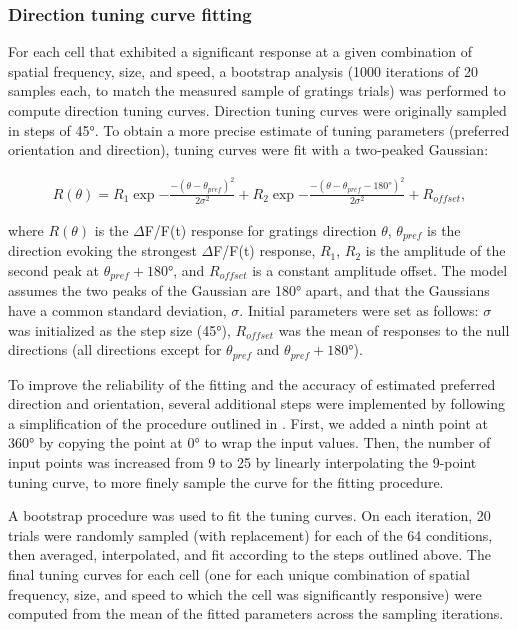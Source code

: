 \subsubsection{Direction tuning curve fitting}
For each cell that exhibited a significant response at a given combination of spatial frequency, size, and speed, a bootstrap analysis (1000 iterations of 20 samples each, to match the measured sample of gratings trials) was performed to compute direction tuning curves. Direction tuning curves were originally sampled in steps of \ang{45}. To obtain a more precise estimate of tuning parameters (preferred orientation and direction), tuning curves were fit with a two-peaked Gaussian\cite{Liang2018, Sun2016}:

\begin{align}
R(\theta) = R_1 \exp{ - \frac{-(\theta-\theta_{pref})^2}{2\sigma^2} } + R_2 \exp{ - \frac{-(\theta-\theta_{pref}-\ang{180})^2}{2\sigma^2} } + R_{offset},
\end{align}

where $R(\theta)$ is the $\Delta$F/F(t) response for gratings direction $\theta$, $\theta_{pref}$ is the direction evoking the strongest $\Delta$F/F(t) response, $R_1$, $R_2$ is the amplitude of the second peak at $\theta_{pref} + \ang{180}$, and $R_{offset}$ is a constant amplitude offset. The model assumes the two peaks of the Gaussian are \ang{180} apart, and that the Gaussians have a common standard deviation, $\sigma$. Initial parameters were set as follows:  $\sigma$ was initialized as the step size (\ang{45}), $R_{offset}$ was the mean of responses to the null directions (all directions except for $\theta_{pref}$ and $\theta_{pref}+\ang{180}$). 

To improve the reliability of the fitting and the accuracy of estimated preferred direction and orientation, several additional steps were implemented by following a simplification of the procedure outlined in \cite{Liang2018}. First, we added a ninth point at \ang{360} by copying the point at \ang{0} to wrap the input values. Then, the number of input points was increased from 9 to 25 by linearly interpolating the 9-point tuning curve, to more finely sample the curve for the fitting procedure.  

A bootstrap procedure was used to fit the tuning curves. On each iteration, 20 trials were randomly sampled (with replacement) for each of the 64 conditions, then averaged, interpolated, and fit according to the steps outlined above. The final tuning curves for each cell (one for each unique combination of spatial frequency, size, and speed to which the cell was significantly responsive) were computed from the mean of the fitted parameters across the sampling iterations. 

